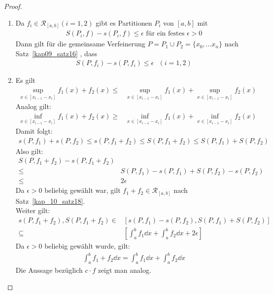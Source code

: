 \begin{proof}
	\begin{enumerate}
		\item Da $f_i \in \mathcal{R}_{[a,b]} (i = 1, 2)$ gibt es Partitionen 
		$P_i$ von $[a,b]$ mit 
		\begin{align*}
			S(P_i,f) - s(P_i,f) \leq \epsilon \text{ für ein festes } \epsilon > 0
		\end{align*}
		Dann gilt für die gemeinsame Verfeinerung $P = P_1 \cup P_2 = \{x_0, \hdots
		x_n\}$ nach Satz~\ref{kap09_satz16}
		, dass 
		\begin{align*}
			S(P,f_i) - s(P, f_i) \leq \epsilon \text{ }(i = 1,2)
		\end{align*}		 
		\item Es gilt 
		\begin{align*}
			\sup_{x \in [x_{i-1}-x_i]} f_1(x) +f_2(x) \leq & 
			\sup_{x \in [x_{i-1}-x_i]} f_1(x) + \sup_{x \in [x_{i-1}-x_i]} f_2(x)
		\end{align*}				
		Analog gilt: 
		\begin{align*}
			\inf_{x \in [x_{i-1}-x_i]} f_1(x) + f_2(x) \geq & 
			\inf_{x \in [x_{i-1}-x_i]} f_1(x) + \inf_{x \in [x_{i-1}-x_i]} f_2(x)
		\end{align*}				
		Damit folgt:
		\begin{align*}
			s(P,f_1) + s(P,f_2) \leq s(P,f_1 +f_2) \leq S(P,f_1 + f_2) 
			\leq S(P,f_1) + S(P,f_2)
		\end{align*}
		Also gilt:
		\begin{align*}
			S(P, f_1 + f_2) - s(P, f_1 +f_2) & \\
			\leq &  S(P, f_1) - s(P,f_1) + S(P,f_2) 
			-s(P,f_2) \\
			 \leq & 2 \epsilon
		\end{align*}
		Da $\epsilon >0 $ beliebig gewählt war, gilt $f_1 + f_2 \in 
		\mathcal{R}_{[a,b]}$ nach Satz~\ref{kap_10_satz18}. \\
		Weiter gilt: 
		\begin{align*}
			s(P, f_1 +f_2), S(P, f_1 + f_2) \in &
			[s(P,f_1) - s(P,f_2), S(P,f_1) + S(P,f_2)] \\
			\subseteq 
			& \left[ \int_a^b f_1 \dd{x} + \int_a^b f_2\dd{x} + 2\epsilon \right]
		\end{align*}
		Da $\epsilon > 0$ beliebig gewählt wurde, gilt:
		\begin{align*}
			\int_a^b f_1 + f_2 \dd{x}  = \int_a^b f_1\dd{x} + \int_a^b f_2 \dd{x}
		\end{align*}
		Die Aussage bezüglich  $c \cdot f$ zeigt man analog.

\end{enumerate}
\end{proof}
